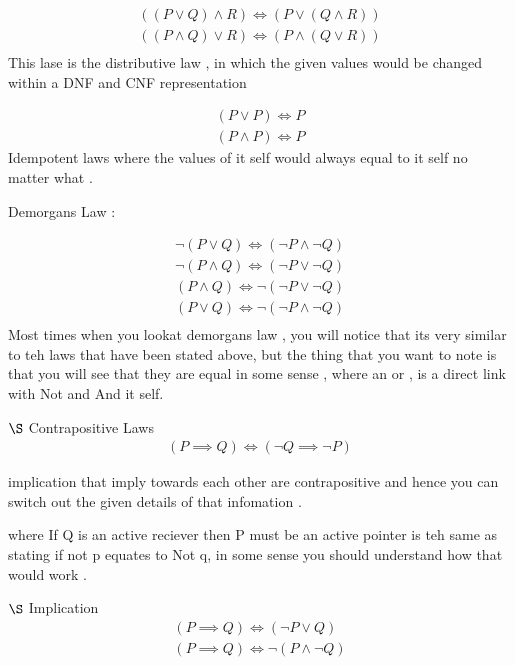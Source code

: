 \documentclass{article}
\theoremstyle{mytheoremstyle}
\theoremstyle{mytheoremstyle}
\theoremstyle{myproblemstyle}
\begin{document}
\[\begin{array}{c}
    ((P \lor Q) \land R) \iff (P \lor (Q \land R))\\
    ((P \land Q) \lor R) \iff (P \land(Q \lor R)) \\
\end{array}\]
This lase is the distributive law , in which the given values would be changed within a DNF and CNF representation

\[\begin{array}{c}
    (P \lor P) \iff P \\
    (P \land P) \iff P
\end{array}\]
Idempotent laws where the values of it self would always equal to it self no matter what .

\item Demorgans Law :

\[\begin{array}{c}
    \neg(P \lor Q) \iff (\neg P \land \neg Q)\\
    \neg(P \land Q) \iff (\neg P \lor \neg Q)\\
    (P \land Q) \iff \neg(\neg P \lor \neg Q)\\
    (P \lor Q) \iff \neg(\neg P \land \neg Q)\\
\end{array}\]
Most times when you lookat demorgans law , you will notice that its very similar to teh laws that have been stated above, but the thing that you want to note is that you will see that they are equal in some sense ,  where an or , is a direct link with Not  and And it self.


\item $\S$ Contrapositive Laws
    \[\begin{array}{c}
    (P \implies Q) \iff (\neg Q \implies \neg P)
    \end{array} \]

    implication that imply towards each other are contrapositive and hence you can switch out the given details of that infomation .

    where If Q is an active reciever then P must be an active pointer is teh same as stating if not p equates to Not q, in some sense you should understand how that would work .

\item $\S$  Implication
\[\begin{array}{c}
    (P \implies Q) \iff (\neg P \lor Q)\\
    (P \implies Q) \iff \neg(P \land \neg Q)
\end{array}\]
\end{document}
